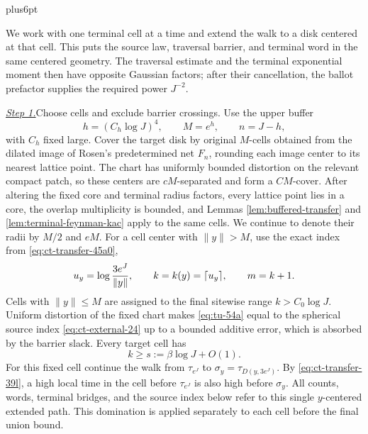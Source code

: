 \documentclass[12pt,reqno]{amsart}
\makeatletter
\theoremstyle{plain}
\theoremstyle{definition}
\theoremstyle{remark}
\renewenvironment{proof}[1][\proofname]{%
  \par
  \pushQED{\qed}%
  \normalfont
  \topsep6pt plus6pt\relax
  \trivlist
  \item[\hskip\labelsep\slshape #1\@addpunct{.}]%
  \ignorespaces
}{%
  \popQED
  \endtrivlist
  \@endpefalse
}
\DeclareRobustCommand{\qed}{%
  \leavevmode\unskip\penalty9999\hbox{}\nobreak
  \ifmmode
    \makebox[0pt][l]{\qquad\hbox{\qedsymbol}}%
  \else
    \qquad\hbox{\qedsymbol}%
  \fi
}
\renewcommand{\qedsymbol}{\rule[.47pt]{4pt}{6pt}}
\numberwithin{equation}{section}
\makeatother
\begin{document}
\begin{proof}[Proof of Proposition~\ref{prop:localized-disk-upper}]
We work with one terminal cell at a time and extend the walk to a disk
centered at that cell. This puts the source law, traversal barrier, and
terminal word in the same centered geometry. The traversal estimate and
the terminal exponential moment then have opposite Gaussian factors;
after their cancellation, the ballot prefactor supplies the required
power \(J^{-2}\).

\smallskip\noindent
\underline{\textit{Step 1.}}\quad Choose cells and exclude barrier crossings.
Use the upper buffer
\[
       h=(C_h\log J)^4,\qquad M=e^h,\qquad n=J-h,
\]
with \(C_h\) fixed large.  Cover the target disk by original \(M\)-cells
obtained from the dilated image of Rosen's predetermined net \(F_n\),
rounding each image center to its nearest lattice point.  The chart has
uniformly bounded distortion on the relevant compact patch, so these
centers are \(cM\)-separated and form a \(CM\)-cover.  After altering the
fixed core and terminal radius factors, every lattice point lies in a
core, the overlap multiplicity is bounded, and Lemmas
\ref{lem:buffered-transfer} and \ref{lem:terminal-feynman-kac}
apply to the same cells.  We continue to denote their radii by \(M/2\) and \(eM\).
For a cell center with \(\|y\|>M\), use the exact index from \eqref{eq:ct-transfer-45a0},
\begin{equation}
 u_y=\log {3e^J\over\|y\|},\qquad
 k=k(y)=\lceil u_y\rceil,\qquad m=k+1.                     \label{eq:tu-54a}
\end{equation}
Cells with \(\|y\|\le M\) are assigned to the final sitewise range
\(k>C_0\log J\).  Uniform distortion of the fixed chart makes \eqref{eq:tu-54a}
equal to the spherical source index \eqref{eq:ct-external-24} up to a bounded additive error,
which is absorbed by the barrier slack.
Every target cell has
\begin{equation}
       k\ge s:=\beta\log J+O(1).                              \label{eq:tu-54}
\end{equation}
For this fixed cell continue the walk from \(\tau_{e^J}\) to
\(\sigma_y=\tau_{D(y,3e^J)}\).  By \eqref{eq:ct-transfer-39l}, a high local time in the cell
before \(\tau_{e^J}\) is also high before \(\sigma_y\).  All counts,
words, terminal bridges, and the source index below refer to this single
\(y\)-centered extended path.  This domination is applied separately to
each cell before the final union bound.


\end{proof}
\end{document}
